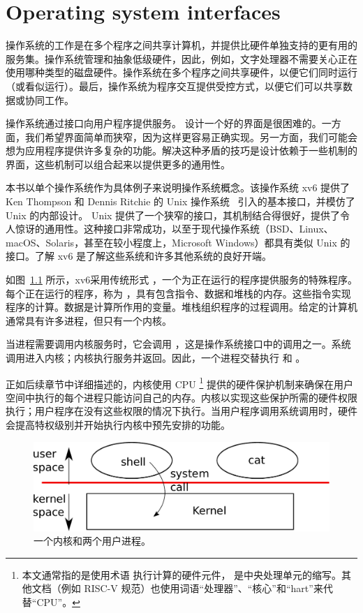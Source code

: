 
   \chapter{Operating system interfaces}   
    \label{CH:UNIX}     

操作系统的工作是在多个程序之间共享计算机，并提供比硬件单独支持的更有用的服务集。操作系统管理和抽象低级硬件，因此，例如，文字处理器不需要关心正在使用哪种类型的磁盘硬件。操作系统在多个程序之间共享硬件，以便它们同时运行（或看似运行）。最后，操作系统为程序交互提供受控方式，以便它们可以共享数据或协同工作。  

操作系统通过接口向用户程序提供服务。
        设计一个好的界面是很困难的。一方面，我们希望界面简单而狭窄，因为这样更容易正确实现。另一方面，我们可能会想为应用程序提供许多复杂的功能。解决这种矛盾的技巧是设计依赖于一些机制的界面，这些机制可以组合起来以提供更多的通用性。  

本书以单个操作系统作为具体例子来说明操作系统概念。该操作系统 xv6 提供了 Ken Thompson 和 Dennis Ritchie 的 Unix 操作系统~    \cite{unix}    引入的基本接口，并模仿了 Unix 的内部设计。 Unix 提供了一个狭窄的接口，其机制结合得很好，提供了令人惊讶的通用性。这种接口非常成功，以至于现代操作系统（BSD、Linux、macOS、Solaris，甚至在较小程度上，Microsoft Windows）都具有类似 Unix 的接口。了解 xv6 是了解这些系统和许多其他系统的良好开端。  

如图~\ref{fig:os}   所示，xv6采用传统形式
        ，一个为正在运行的程序提供服务的特殊程序。每个正在运行的程序，称为
        ，具有包含指令、数据和堆栈的内存。这些指令实现程序的计算。数据是计算所作用的变量。堆栈组织程序的过程调用。给定的计算机通常具有许多进程，但只有一个内核。  

当进程需要调用内核服务时，它会调用        ，这是操作系统接口中的调用之一。系统调用进入内核；内核执行服务并返回。因此，一个进程交替执行
        和
        。  

正如后续章节中详细描述的，内核使用 CPU    \footnote{本文通常指的是使用术语        执行计算的硬件元件，       是中央处理单元的缩写。其他文档（例如 RISC-V 规范）也使用词语“处理器”、“核心”和“hart”来代替“CPU”。  }    提供的硬件保护机制来确保在用户空间中执行的每个进程只能访问自己的内存。内核以实现这些保护所需的硬件权限执行；用户程序在没有这些权限的情况下执行。当用户程序调用系统调用时，硬件会提高特权级别并开始执行内核中预先安排的功能。  

   \begin{figure}[t]
\center
\includegraphics[scale=0.5]{fig/os.pdf}
\caption{一个内核和两个用户进程。  }
\label{fig:os}
\end{figure}     

